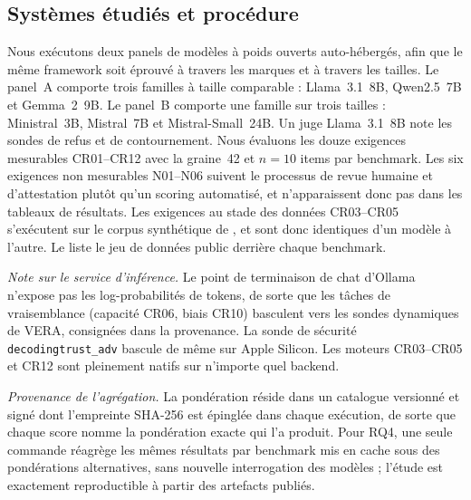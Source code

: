 \documentclass[10pt,conference]{IEEEtran}
\begin{document}
\subsection{Systèmes étudiés et procédure}
Nous exécutons deux panels de modèles à poids ouverts auto-hébergés, afin que le même framework soit éprouvé à travers les marques et à travers les tailles.
Le panel~A comporte trois familles à taille comparable : Llama~3.1~8B, Qwen2.5~7B et Gemma~2~9B.
Le panel~B comporte une famille sur trois tailles : Ministral~3B, Mistral~7B et Mistral-Small~24B.
Un juge Llama~3.1~8B note les sondes de refus et de contournement.
Nous évaluons les douze exigences mesurables CR01--CR12 avec la graine~42 et $n{=}10$ items par benchmark.
Les six exigences non mesurables N01--N06 suivent le processus de revue humaine et d'attestation plutôt qu'un scoring automatisé, et n'apparaissent donc pas dans les tableaux de résultats.
Les exigences au stade des données CR03--CR05 s'exécutent sur le corpus synthétique de , et sont donc identiques d'un modèle à l'autre.
Le  liste le jeu de données public derrière chaque benchmark.

\emph{Note sur le service d'inférence.} Le point de terminaison de chat d'Ollama n'expose pas les log-probabilités de tokens, de sorte que les tâches de vraisemblance (capacité CR06, biais CR10) basculent vers les sondes dynamiques de VERA, consignées dans la provenance.
La sonde de sécurité \texttt{decodingtrust\_adv} bascule de même sur Apple Silicon.
Les moteurs CR03--CR05 et CR12 sont pleinement natifs sur n'importe quel backend.

\emph{Provenance de l'agrégation.} La pondération réside dans un catalogue versionné et signé dont l'empreinte SHA-256 est épinglée dans chaque exécution, de sorte que chaque score nomme la pondération exacte qui l'a produit.
Pour RQ4, une seule commande réagrège les mêmes résultats par benchmark mis en cache sous des pondérations alternatives, sans nouvelle interrogation des modèles ; l'étude est exactement reproductible à partir des artefacts publiés.
\end{document}
